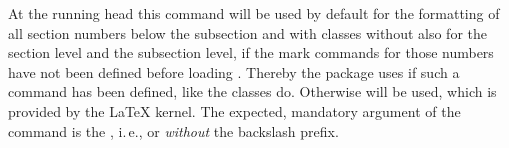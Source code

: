 \fi %


\ifshortversion\IgnoreThistrue{}\fi
\ifIgnoreThis %
\else %

\begin{Declaration}
\end{Declaration}
%
At the running head this command will be used by default for the formatting of
all section numbers below the subsection and with classes without
 also for the section level and the subsection level, if the
mark commands for those numbers have not been defined before loading
. Thereby the package uses  if such
a command has been defined, like the \KOMAScript{} classes do. Otherwise
 will be used, which is provided by the \LaTeX{}
kernel. The expected, mandatory argument of the command is the , i.\,e.,  or 
\emph{without} the backslash prefix.


